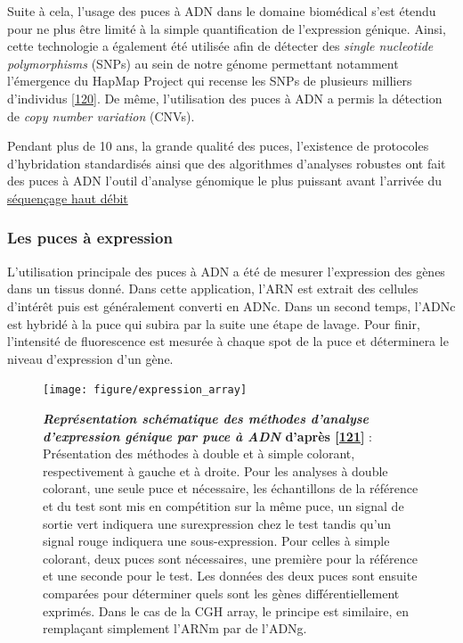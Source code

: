 \documentclass[12pt,a4paper,twoside]{ugathesis}
\theoremstyle{definition}
\theoremstyle{definition}
\theoremstyle{definition}
\theoremstyle{remark}
\begin{document}
Suite à cela, l'usage des puces à ADN dans le domaine biomédical s'est
étendu pour ne plus être limité à la simple quantification de
l'expression génique. Ainsi, cette technologie a également été utilisée
afin de détecter des \emph{single nucleotide polymorphisms} (SNPs) au
sein de notre génome permettant notamment l'émergence du HapMap Project
qui recense les SNPs de plusieurs milliers d'individus
{[}\protect\hyperlink{ref-Cutler2001}{120}{]}. De même, l'utilisation
des puces à ADN a permis la détection de \emph{copy number variation}
(CNVs).

Pendant plus de 10 ans, la grande qualité des puces, l'existence de
protocoles d'hybridation standardisés ainsi que des algorithmes
d'analyses robustes ont fait des puces à ADN l'outil d'analyse génomique
le plus puissant avant l'arrivée du \protect\hyperlink{ngs}{séquençage
haut débit}

\newpage

\subsubsection{Les puces à expression}\label{les-puces-a-expression}

L'utilisation principale des puces à ADN a été de mesurer l'expression
des gènes dans un tissus donné. Dans cette application, l'ARN est
extrait des cellules d'intérêt puis est généralement converti en ADNc.
Dans un second temps, l'ADNc est hybridé à la puce qui subira par la
suite une étape de lavage. Pour finir, l'intensité de fluorescence est
mesurée à chaque spot de la puce et déterminera le niveau d'expression
d'un gène.

\begin{figure}

{\centering \texttt{[image: figure/expression\_array]} 

}

\caption[Représentation schématique des méthodes d'analyse d'expression génique par puce à ADN]{\textbf{\emph{Représentation schématique des méthodes
d'analyse d'expression génique par puce à ADN} d'après
{[}\protect\hyperlink{ref-Trevino2007}{121}{]}} : Présentation des
méthodes à double et à simple colorant, respectivement à gauche et à
droite. Pour les analyses à double colorant, une seule puce et
nécessaire, les échantillons de la référence et du test sont mis en
compétition sur la même puce, un signal de sortie vert indiquera une
surexpression chez le test tandis qu'un signal rouge indiquera une
sous-expression. Pour celles à simple colorant, deux puces sont
nécessaires, une première pour la référence et une seconde pour le test.
Les données des deux puces sont ensuite comparées pour déterminer quels
sont les gènes différentiellement exprimés. Dans le cas de la CGH array,
le principe est similaire, en remplaçant simplement l'ARNm par de
l'ADNg.}\label{fig:pictexparray}
\end{figure}
\end{document}
